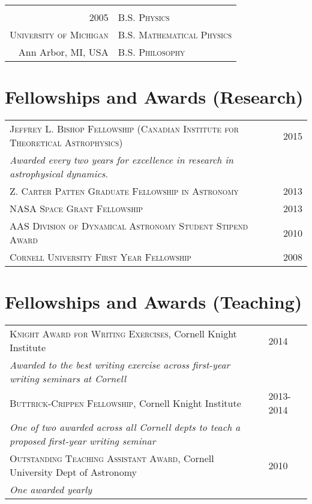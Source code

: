 \documentclass[10pt]{article} %
\begin{document}
{\begin{tabular}{r|p{11cm}}
\multicolumn{2}{c}{} \\


\textsc{2005} & \textsc{B.S. Physics} \\
\textsc{University of Michigan} & \textsc{B.S. Mathematical Physics} \\
Ann Arbor, MI, USA & \textsc{B.S. Philosophy} \\
\end{tabular}


\section{Fellowships and Awards (Research)}

\begin{tabular}{l>{\hfill}p{1.1cm}}
\textsc{Jeffrey L. Bishop Fellowship (Canadian Institute for Theoretical Astrophysics)} & 2015 \\
{\it Awarded every two years for excellence in research in astrophysical dynamics.} \\
\textsc{Z. Carter Patten Graduate Fellowship in Astronomy} & 2013 \\
\textsc{NASA Space Grant Fellowship} & 2013 \\
\textsc{AAS Division of Dynamical Astronomy Student Stipend Award} & 2010\\
\textsc{Cornell University First Year Fellowship} & 2008 \\
\end{tabular}

\section{Fellowships and Awards (Teaching)}

\begin{tabular}{l>{\hfill}p{}}
\textsc{Knight Award for Writing Exercises}, Cornell Knight Institute & 2014 \\
{\it Awarded to the best writing exercise across first-year writing seminars at Cornell} \\
\textsc{Buttrick-Crippen Fellowship}, Cornell Knight Institute & 2013-2014 \\
{\it One of two awarded across all Cornell depts to teach a proposed first-year writing seminar} \\
\textsc{Outstanding Teaching Assistant Award}, Cornell University Dept of Astronomy & 2010 \\
{\it One awarded yearly} \\
\end{tabular}


}
\end{document}
